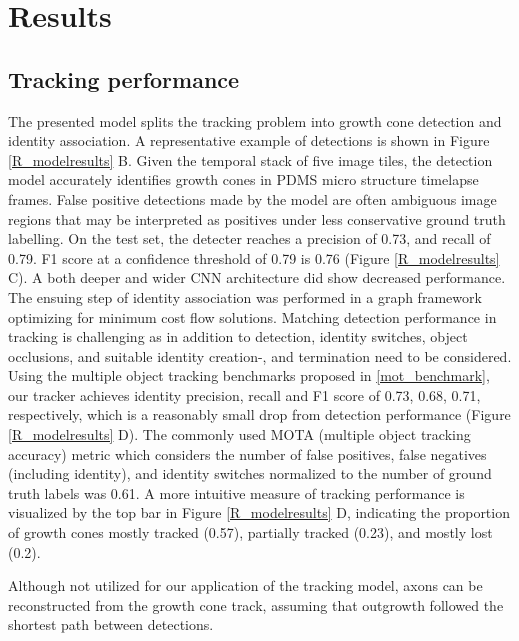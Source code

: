 \section{Results}
\subsection{Tracking performance}
The presented model splits the tracking problem into growth cone detection and
identity association. A representative example of detections is shown in Figure
\ref{R_modelresults} B. Given the temporal stack of five image tiles, the
detection model accurately identifies growth cones in PDMS micro structure
timelapse frames. False positive detections made by the model are often
ambiguous image regions that may be interpreted as positives under less
conservative ground truth labelling. On the test set, the detecter reaches a
precision of 0.73, and recall of 0.79. F1 score at a confidence threshold of
0.79 is 0.76 (Figure \ref{R_modelresults} C). A both deeper and wider CNN
architecture did show decreased performance. The ensuing step of identity
association was performed in a graph framework optimizing for minimum cost flow
solutions. Matching detection performance in tracking is challenging as in
addition to detection, identity switches, object occlusions, and suitable
identity creation-, and termination need to be considered. Using the multiple
object tracking benchmarks proposed in \ref{mot_benchmark}, our tracker achieves
identity precision, recall and F1 score of 0.73, 0.68, 0.71, respectively, which
is a reasonably small drop from detection performance (Figure
\ref{R_modelresults} D). The commonly used MOTA (multiple object tracking
accuracy) metric which considers the number of false positives, false negatives
(including identity), and identity switches normalized to the number of ground
truth labels was 0.61. A more intuitive measure of tracking performance is
visualized by the top bar in Figure \ref{R_modelresults} D, indicating the
proportion of growth cones mostly tracked (0.57), partially tracked (0.23), and
mostly lost (0.2). 

Although not utilized for our application of the tracking model, axons can be
reconstructed from the growth cone track, assuming that outgrowth followed the
shortest path between detections. 



